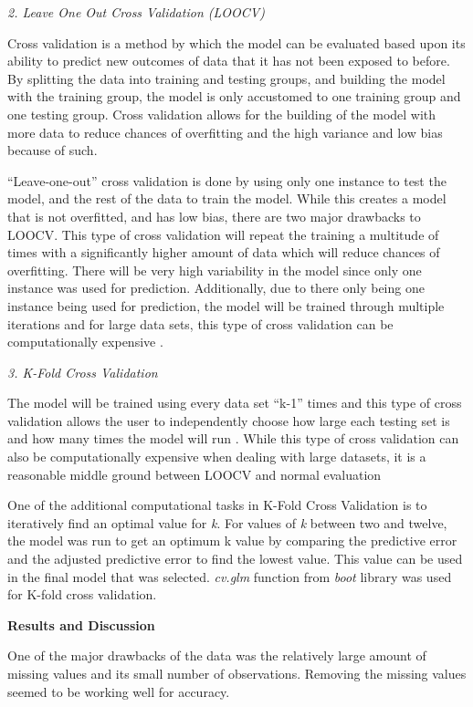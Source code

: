 \documentclass[11pt]{article}
\begin{document}
{\it 2. Leave One Out Cross Validation (LOOCV)}

Cross validation is a method by which the model can be evaluated based upon its ability to predict new outcomes of data that it has not been exposed to before. By splitting the data into training and testing groups, and building the model with the training group, the model is only accustomed to one training group and one testing group. Cross validation allows for the  building of the model with more data to reduce chances of overfitting and the high variance and low bias because of such.

“Leave-one-out” cross validation is done by using only one instance to test the model, and the rest of the data to train the model. While this creates a model that is not overfitted, and has low bias, there are two major drawbacks to LOOCV. This type of cross validation will repeat the training a multitude of times with a significantly higher amount of data which will reduce chances of overfitting. There will be very high variability in the model since only one instance was used for prediction. Additionally, due to there only being one instance being used for prediction, the model will be trained through multiple iterations and for large data sets, this type of cross validation can be computationally expensive \cite{k-fold}.

{\it 3. K-Fold Cross Validation}

The model will be trained using every data set “k-1” times and this type of cross validation allows the user to independently choose how large each testing set is and how many times the model will run \cite{k-fold}. While this type of cross validation can also be computationally expensive when dealing with large datasets, it is a reasonable middle ground between LOOCV and normal evaluation \cite{crossval} 

One of the additional computational tasks in K-Fold Cross Validation is to iteratively find an optimal value for {\it k}. For values of {\it k} between two and twelve, the model was run to get an optimum k value by comparing the predictive error and the adjusted predictive error to find the lowest value. This value can be used in the final model that was selected. {\it cv.glm} function from {\it boot} library was used for K-fold cross validation.

\newpage
{\bf Results and Discussion}

One of the major drawbacks of the data was the relatively  large amount of missing values and its small number of observations. Removing the missing values seemed to be working well for accuracy. 
\end{document}
